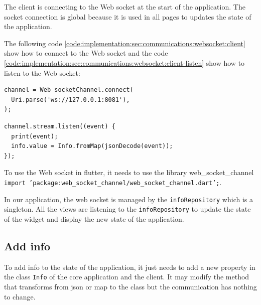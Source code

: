 The client is connecting to the Web socket at the start of the application.
The socket connection is global because it is used in all pages to updates the state of the application.

The following code \ref{code:implementation:sec:communications:websocket:client} show how to connect to the Web socket and the code \ref{code:implementation:sec:communications:websocket:client-listen} show how to listen to the Web socket:

\begin{code}
  \label{code:implementation:sec:communications:websocket:client}
  \begin{verbatim}
channel = Web socketChannel.connect(
  Uri.parse('ws://127.0.0.1:8081'),
);
  \end{verbatim}
\end{code}

\begin{code}
  \label{code:implementation:sec:communications:websocket:client-listen}
  \begin{verbatim}
channel.stream.listen((event) {
  print(event);
  info.value = Info.fromMap(jsonDecode(event));
});
  \end{verbatim}
\end{code}

To use the Web socket in flutter, it needs to use the library web\_socket\_channel \texttt{import 'package:web\_socket\_channel/web\_socket\_channel.dart';}.

In our application, the web socket is managed by the \texttt{infoRepository} which is a singleton.
All the views are listening to the \texttt{infoRepository} to update the state of the widget and display the new state of the application.


\subsection{Add info}
\label{ch:implementation:sec:communications:add-info}

To add info to the state of the application, it just needs to add a new property in the class \texttt{Info} of the core application and the client.
It may modify the method that transforms from json or map to the class but the communication has nothing to change.
